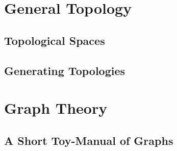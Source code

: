 



\part{General Topology}

\chapter{Topological Spaces}







\chapter{Generating Topologies}





\part{Graph Theory}

\chapter{A Short Toy-Manual of Graphs}







